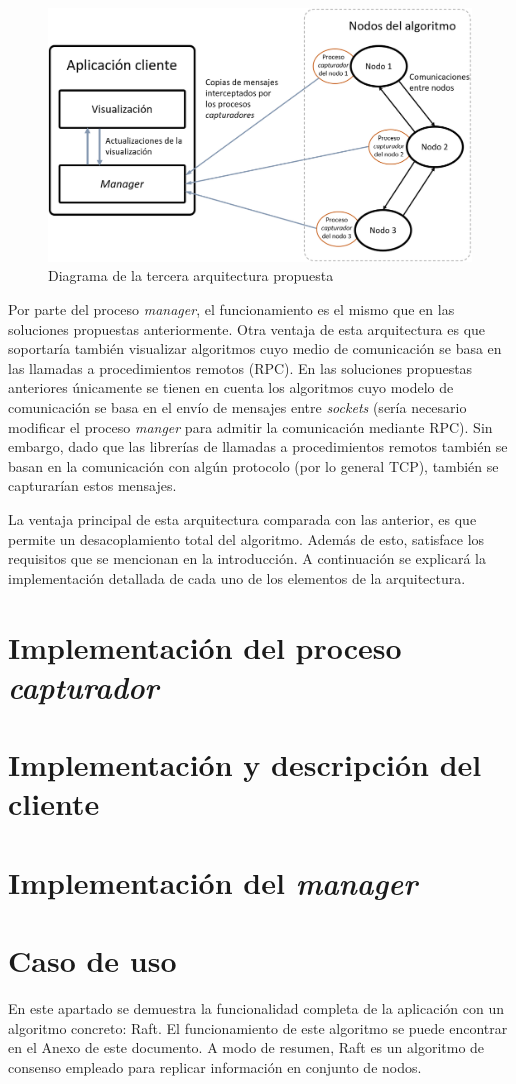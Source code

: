 \begin{figure}[h]
  \centering
  \includegraphics[width=0.7\linewidth]{imagenes/arquitectura3}
  \caption{Diagrama de la tercera arquitectura propuesta}
  \label{fig:arquitectura3}
\end{figure}

Por parte del proceso \textit{manager}, el funcionamiento es el mismo que en las soluciones propuestas anteriormente. Otra ventaja de esta arquitectura es que soportaría también visualizar algoritmos cuyo medio de comunicación se basa en las llamadas a procedimientos remotos (RPC). En las soluciones propuestas anteriores únicamente se tienen en cuenta los algoritmos cuyo modelo de comunicación se basa en el envío de mensajes entre \textit{sockets} (sería necesario modificar el proceso \textit{manger} para admitir la comunicación mediante RPC). Sin embargo, dado que las librerías de llamadas a procedimientos remotos también se basan en la comunicación con algún protocolo (por lo general TCP), también se capturarían estos mensajes.

La ventaja principal de esta arquitectura comparada con las anterior, es que permite un desacoplamiento total del algoritmo. Además de esto, satisface los requisitos que se mencionan en la introducción. A continuación se explicará la implementación detallada de cada uno de los elementos de la arquitectura.

\section{Implementación del proceso \textit{capturador}}

\section{Implementación y descripción del cliente}

\section{Implementación del \textit{manager}}

\section{Caso de uso}

En este apartado se demuestra la funcionalidad completa de la aplicación con un algoritmo concreto: Raft. El funcionamiento de este algoritmo se puede encontrar en el Anexo de este documento. A modo de resumen, Raft es un algoritmo de consenso empleado para replicar información en conjunto de nodos.

